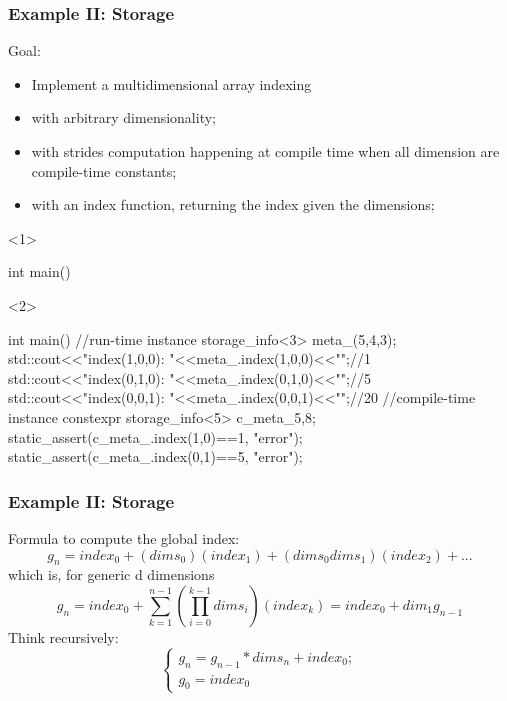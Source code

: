\documentclass[aspectratio=43]{beamer}
\begin{document}
\begin{frame}[fragile]\frametitle{Example II: Storage}
  Goal:
  \begin{itemize}
  \item Implement a multidimensional array indexing
  \item with arbitrary dimensionality;
  \item with strides computation happening at compile time when all dimension are compile-time constants;
  \item with an index function, returning the index given the dimensions;
  \end{itemize}

  \begin{onlyenv}<1>
    \begin{Cpplisting}{}
int main(){









}
    \end{Cpplisting}
  \end{onlyenv}
  \begin{onlyenv}<2>
  \begin{Cpplisting}{}
int main(){
  //run-time instance
  storage_info<3> meta_(5,4,3);
  std::cout<<"index(1,0,0): "<<meta_.index(1,0,0)<<"\n";//1
  std::cout<<"index(0,1,0): "<<meta_.index(0,1,0)<<"\n";//5
  std::cout<<"index(0,0,1): "<<meta_.index(0,0,1)<<"\n";//20
  //compile-time instance
  constexpr storage_info<5> c_meta_{5,8};
  static_assert(c_meta_.index(1,0)==1, "error");
  static_assert(c_meta_.index(0,1)==5, "error");
}
    \end{Cpplisting}
  \end{onlyenv}
\end{frame}


\begin{frame}[fragile]\frametitle{Example II: Storage}
  Formula to compute the global index:
  $$
  g_n = index_0 + (dims_{0})(index_{1}) + (dims_{0}dims_{1})(index_{2}) + ...
  $$
  which is, for generic d dimensions
  $$
  g_n = index_0 + \sum_{k=1}^{n-1}\left(\prod_{i=0}^{k-1}dims_i\right)(index_{k}) = index_0 + dim_1g_{n-1}
  $$
  Think recursively:
  $$
    \left\{
  \begin{array}{l}
      g_n = g_{n-1} * dims_{n} + index_{0};\\
      g_0 = index_0
  \end{array}
  \right.
  $$


\end{frame}
\end{document}
